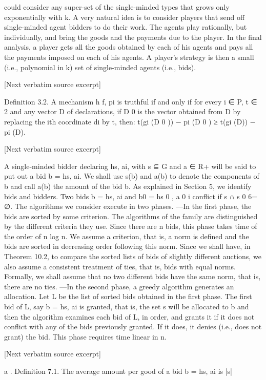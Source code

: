 \documentclass[10pt]{article}
\begin{document}
\begin{ReviewVerbatim}

could consider any super-set of the single-minded types that grows only exponentially with k. A very natural idea is to consider players that send off single-minded
agent bidders to do their work. The agents play rationally, but individually, and
bring the goods and the payments due to the player. In the final analysis, a player
gets all the goods obtained by each of his agents and pays all the payments imposed
on each of his agents. A player’s strategy is then a small (i.e., polynomial in k) set
of single-minded agents (i.e., bids).

[Next verbatim source excerpt]

Definition 3.2. A mechanism h f, pi is truthful if and only if for every i ∈ P,
t ∈ 2 and any vector D of declarations, if D 0 is the vector obtained from D by
replacing the ith coordinate di by t, then: t(gi (D 0 )) − pi (D 0 ) ≥ t(gi (D)) − pi (D).

[Next verbatim source excerpt]

A single-minded bidder declaring hs, ai, with s ⊆ G and a ∈ R+ will be said to
put out a bid b = hs, ai. We shall use s(b) and a(b) to denote the components of b
and call a(b) the amount of the bid b. As explained in Section 5, we identify bids
and bidders. Two bids b = hs, ai and b0 = hs 0 , a 0 i conflict if s ∩ s 0 6= ∅.
The algorithms we consider execute in two phases.
—In the first phase, the bids are sorted by some criterion. The algorithms of the
family are distinguished by the different criteria they use. Since there are n bids,
this phase takes time of the order of n log n. We assume a criterion, that is, a norm
is defined and the bids are sorted in decreasing order following this norm. Since
we shall have, in Theorem 10.2, to compare the sorted lists of bids of slightly
different auctions, we also assume a consistent treatment of ties, that is, bids
with equal norms. Formally, we shall assume that no two different bids have the
same norm, that is, there are no ties.
—In the second phase, a greedy algorithm generates an allocation. Let L be the
list of sorted bids obtained in the first phase. The first bid of L, say b = hs, ai is
granted, that is, the set s will be allocated to b and then the algorithm examines
each bid of L, in order, and grants it if it does not conflict with any of the bids
previously granted. If it does, it denies (i.e., does not grant) the bid. This phase
requires time linear in n.

[Next verbatim source excerpt]

a
.
Definition 7.1. The average amount per good of a bid b = hs, ai is |s|
\end{ReviewVerbatim}
\end{document}
